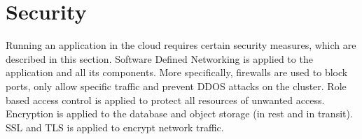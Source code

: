 \documentclass[conference]{IEEEtran}
\begin{document}
\section{Security}
Running an application in the cloud requires certain security measures, which are described in this section.
Software Defined Networking is applied to the application and all its components. More specifically,
firewalls are used to block ports, only allow specific traffic and prevent DDOS attacks on the cluster.
Role based access control is applied to protect all resources of unwanted access. \\
Encryption is applied to the database and object storage (in rest and in transit). SSL and TLS is
applied to encrypt network traffic.
\end{document}
